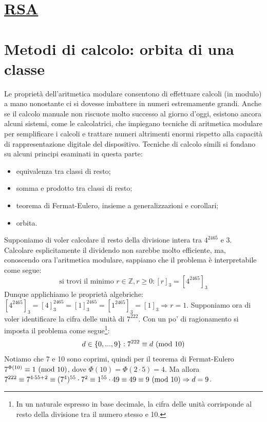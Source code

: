 \documentclass[oneside]{book}
\begin{document}
\section{\underline{RSA}}


\section{Metodi di calcolo: orbita di una classe}
Le proprietà dell'aritmetica modulare consentono di effettuare calcoli (in modulo)
a mano nonostante ci si dovesse imbattere in numeri estremamente grandi.
Anche se il calcolo manuale non riscuote molto successo al giorno d'oggi,
esistono ancora alcuni sistemi, come le calcolatrici, che impiegano
tecniche di aritmetica modulare per semplificare i calcoli e trattare
numeri altrimenti enormi rispetto alla capacità di rappresentazione digitale
del dispositivo.
Tecniche di calcolo simili si fondano su alcuni principi esaminati in
questa parte:
\begin{itemize}
\item equivalenza tra classi di resto;
\item somma e prodotto tra classi di resto;
\item teorema di Fermat-Eulero, insieme a generalizzazioni e corollari;
\item orbita.
\end{itemize}
Supponiamo di voler calcolare il resto della divisione intera tra
$4^{2465}$ e $3$. Calcolare esplicitamente il dividendo non sarebbe
molto efficiente, ma, conoscendo ora l'aritmetica modulare, sappiamo
che il problema è interpretabile come segue:
\[ \text{si trovi il minimo } r\in\mathbb{Z},r\geq0: [r]_3 = [4^{2465}]_3 \]
Dunque applichiamo le proprietà algebriche: $[4^{2465}]_3 = [4]^{2465}_3 = [1]_3^{2465} = [1^{2465}]_3 = [1]_3 \Rightarrow r = 1$.
Supponiamo ora di voler identificare la cifra delle unità di $7^{222}$.
Con un po' di ragionamento si imposta il problema come segue\footnote{In un naturale espresso in
base decimale, la cifra delle unità corrisponde al resto della divisione tra il numero stesso e 10.}:
\[ d\in\{0,...,9\}: 7^{222}\equiv d\ (\mathrm{mod}\ 10) \]
Notiamo che 7 e 10 sono coprimi, quindi per il teorema di Fermat-Eulero
$7^{\Phi(10)}\equiv 1 \ (\mathrm{mod}\ 10)$, dove $\Phi(10)=\Phi(2\cdot5)=4$. Ma
allora $7^{222}\equiv 7^{4\cdot55+2} \equiv (7^4)^{55}\cdot7^2\equiv 1^{55}\cdot 49 \equiv 49\equiv 9 \ (\mathrm{mod}\ 10) \Rightarrow d=9$.
\end{document}
